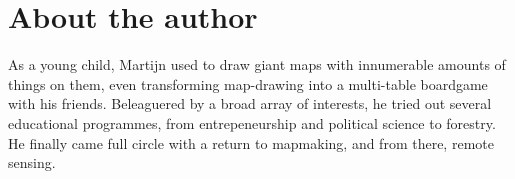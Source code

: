 \chapter{About the author}

As a young child, Martijn used to draw giant maps with innumerable amounts of things on them, even transforming map-drawing into a multi-table boardgame with his friends. Beleaguered by a broad array of interests, he tried out several educational programmes, from entrepeneurship and political science to forestry. He finally came full circle with a return to mapmaking, and from there, remote sensing.


\nocite{*}
\printbibliography[heading=subbibliography, title={Peer-reviewed Journal Publications}, type=article]
\printbibliography[heading=subbibliography, title={Other Scientific Publications}, nottype=article]
	

